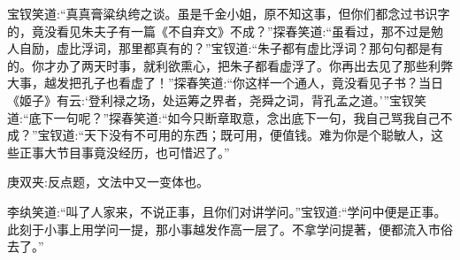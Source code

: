 \begin{parag}
    宝钗笑道:“真真膏粱纨绔之谈。虽是千金小姐，原不知这事，但你们都念过书识字的，竟没看见朱夫子有一篇《不自弃文》不成？”探春笑道:“虽看过，那不过是勉人自励，虚比浮词，那里都真有的？”宝钗道:“朱子都有虚比浮词？那句句都是有的。你才办了两天时事，就利欲熏心，把朱子都看虚浮了。你再出去见了那些利弊大事，越发把孔子也看虚了！”探春笑道:“你这样一个通人，竟没看见子书？当日《姬子》有云:‘登利禄之场，处运筹之界者，尧舜之词，背孔孟之道。’”宝钗笑道:“底下一句呢？”探春笑道:“如今只断章取意，念出底下一句，我自己骂我自己不成？”宝钗道:“天下没有不可用的东西；既可用，便值钱。难为你是个聪敏人，这些正事大节目事竟没经历，也可惜迟了。”\begin{note}庚双夹:反点题，文法中又一变体也。\end{note}李纨笑道:“叫了人家来，不说正事，且你们对讲学问。”宝钗道:“学问中便是正事。此刻于小事上用学问一提，那小事越发作高一层了。不拿学问提著，便都流入市俗去了。”
\end{parag}


